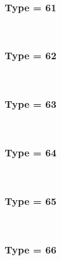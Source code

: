 \documentclass{article}
\begin{document}
            \\
        
        
        
            \subsubsection*{Type = 61}    
            
            \\
        
        
        
            \subsubsection*{Type = 62}    
            
            \\
        
        
        
            \subsubsection*{Type = 63}    
            
            \\
        
        
        
            \subsubsection*{Type = 64}    
            
            \\
        
        
        
            \subsubsection*{Type = 65}    
            
            \\
        
        
        
            \subsubsection*{Type = 66}    
            
            \\
        
\end{document}
